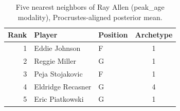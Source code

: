 \begin{table}[htbp]
  \centering\small
  \begin{tabular}{rllc}
    \toprule
    Rank & Player & Position & Archetype \\
    \midrule
    1 & Eddie Johnson & F & 1 \\
    2 & Reggie Miller & G & 1 \\
    3 & Peja Stojakovic & F & 1 \\
    4 & Eldridge Recasner & G & 4 \\
    5 & Eric Piatkowski & G & 1 \\
    \bottomrule
  \end{tabular}
  \caption{Five nearest neighbors of Ray Allen (peak_age modality), Procrustes-aligned posterior mean.}
  \label{tab:Ray_Allen_neighbors_peak_age}
\end{table}

